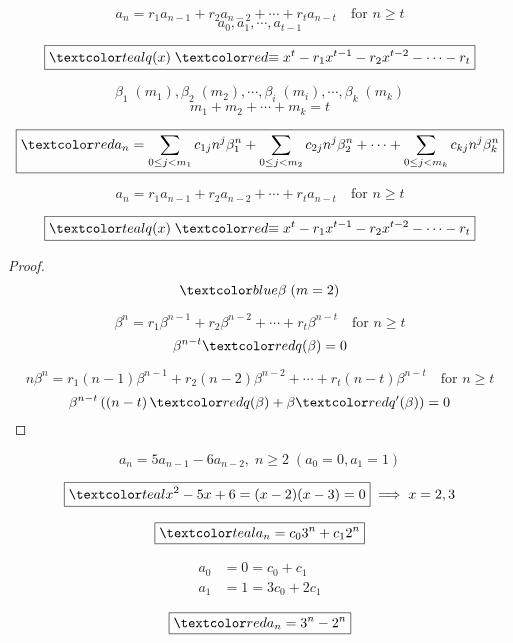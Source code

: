 \begin{frame}{}
  \begin{theorem}
    \[
      a_n = r_1 a_{n-1} + r_2 a_{n-2} + \cdots + r_t a_{n-t} \quad \text{for } n \ge t
    \]
    \[
      a_0, a_1, \cdots, a_{t-1}
    \]

    \pause
    \[
      \boxed{\teal{q(x) \;\red{\equiv}\; x^t - r_1 x^{t-1} - r_2 x^{t-2} - \cdots - r_t}}
    \]

    \pause
    \[
      \beta_1\; (m_1), \beta_2\; (m_2), \cdots, \beta_i\; (m_i), \cdots, \beta_{k}\; (m_k)
    \]
    \[
      m_1 + m_2 + \cdots + m_k = t
    \]

    \pause
    \[
      \boxed{\red{a_n = \sum_{0 \le j < m_1} c_{1j} n^j \beta_{1}^{n} + \sum_{0 \le j < m_2} c_{2j} n^j \beta_{2}^{n} + \cdots 
	+ \sum_{0 \le j < m_k} c_{kj} n^j \beta_{k}^{n}}}
    \]
  \end{theorem}
\end{frame}

\begin{frame}{}
  \[
    a_n = r_1 a_{n-1} + r_2 a_{n-2} + \cdots + r_t a_{n-t} \quad \text{for } n \ge t
  \]

  \[
    \boxed{\teal{q(x) \;\red{\equiv}\; x^t - r_1 x^{t-1} - r_2 x^{t-2} - \cdots - r_t}}
  \]

  \pause
  \begin{proof}
    \[
      \blue{\beta \; (m = 2)}
    \]

    \pause
    \[
      \beta^n = r_1 \beta^{n-1} + r_2 \beta^{n-2} + \cdots + r_t \beta^{n-t} \quad \text{for } n \ge t
    \]
    \pause
    \vspace{-0.50cm}
    \[
      \beta^{n-t} \red{q(\beta)} = 0
    \]

    \pause
    \vspace{-0.50cm}
    \[
      n\beta^{n} = r_1 (n-1) \beta^{n-1} + r_2 (n-2) \beta^{n-2} + \cdots + r_t (n-t) \beta^{n-t} \quad \text{for } n \ge t
    \]
    \pause
    \vspace{-0.50cm}
    \[
      \beta^{n-t} \left(\left(n-t\right)\red{q(\beta)} + \beta \red{q'(\beta)}\right) = 0
    \]
  \end{proof}
\end{frame}

\begin{frame}{}
  \[
    a_n = 5a_{n-1} - 6a_{n-2},\; n \ge 2 \; (a_0 = 0, a_1 = 1)
  \]

  \pause
  \[
    \boxed{\teal{x^2 - 5x + 6 = (x-2) (x-3) = 0}} \implies x = 2, 3
  \]

  \pause
  \[
    \boxed{\teal{a_n = c_0 3^n + c_1 2^n}}
  \]
  
  \pause
  \begin{align*}
    a_0 &= 0 = c_0 + c_1 \\
    a_1 &= 1 = 3c_0 + 2c_1
  \end{align*}

  \pause
  \[
    \boxed{\red{a_n = 3^n - 2^n}}
  \]
\end{frame}

